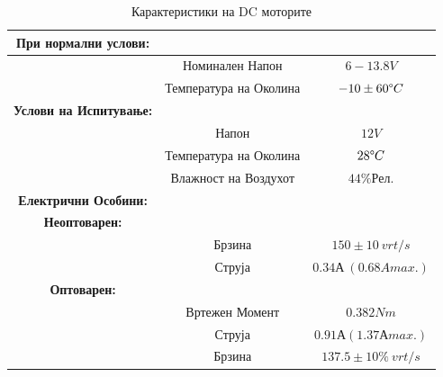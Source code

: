 \documentclass[12pt]{article}
\begin{document}
      \begin{table}[h]
        \caption{Карактеристики на DC моторите}
        \label{tab:dcmotor}
        \begin{center}
          \begin{tabular}{||c|c|c||}
            \hline
            \textbf{При нормални услови:} & & \\
            \hline
             & Номинален Напон & $6-13.8V$\\
             & Температура на Околина & $-10 \pm 60 \degree C$\\
            \hline
            \textbf{Услови на Испитување:} & & \\
            \hline
            & Напон & $12V$ \\
            & Температура на Околина & $28 \degree C$\\
            & Влажност на Воздухот & $44\% Рел.$\\
            \hline
            \textbf{Електрични Особини:} & & \\
            \hline
            \textbf{Неоптоварен:} & & \\
            \hline
            & Брзина & $150 \pm 10 \ vrt/s$ \\
            & Струја & $0.34А\ (0.68A max.)$ \\
            \hline
            \textbf{Оптоварен:} & &\\
            \hline
            & Вртежен Момент & $0.382Nm $\\
            & Струја & $0.91А (1.37А max.)$\\
            & Брзина & $137.5 \pm 10 \%\ vrt/s$\\
            \hline
          \end{tabular}
        \end{center}
      \end{table}
\end{document}
